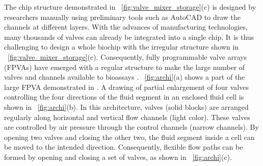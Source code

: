 The chip structure demonstrated in \figname~\ref{fig:valve_mixer_storage}(c)
is designed by researchers manually
using preliminary tools such as AutoCAD to draw the channels at different
layers. 
With the advances of manufacturing technologies, many thousands of valves can
already be integrated into a single chip.
It is thus challenging to design a whole biochip with the irregular structure
shown in \figname~\ref{fig:valve_mixer_storage}(c).
Consequently, 
fully programmable valve arrays (FPVAs)
have emerged with a regular structure to make the large number of valves and
channels available to bioassays \cite{JMSQ07,matrix11}.
\figname~\ref{fig:archi}(a) shows a part of the large FPVA demonstrated in
\cite{matrix11}. A drawing of partial enlargement of four valves controlling
the four directions of the fluid segment  in an enclosed fluid cell is shown in
\figname~\ref{fig:archi}(b). In this architecture, valves (solid blocks) are
arranged regularly along horizontal and vertical flow channels (light color).
These valves are controlled by air pressure through the control
channels (narrow channels). By opening two valves and closing the other two,
the fluid segment inside a cell can be moved to the intended direction.
Consequently, flexible flow paths can be formed by opening
and closing a set of valves, as shown in \figname~\ref{fig:archi}(c). 

